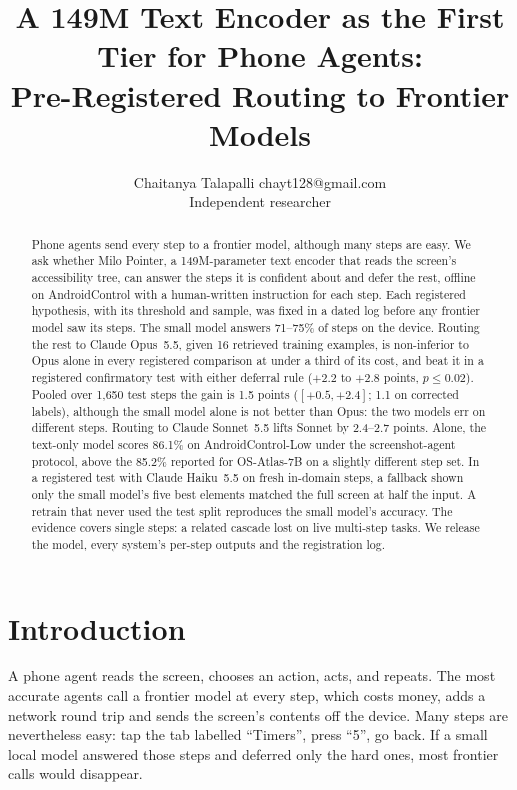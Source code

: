 \documentclass[10pt]{article}
\title{A 149M Text Encoder as the First Tier for Phone Agents:\\Pre-Registered Routing to Frontier Models}
\author{\name Chaitanya Talapalli \email chayt128@gmail.com\\
\addr Independent researcher}
\begin{document}
\maketitle

\begin{abstract}
Phone agents send every step to a frontier model, although many steps are easy. We ask whether Milo Pointer, a 149M-parameter text encoder that reads the screen's accessibility tree, can answer the steps it is confident about and defer the rest, offline on AndroidControl with a human-written instruction for each step. Each registered hypothesis, with its threshold and sample, was fixed in a dated log before any frontier model saw its steps. The small model answers 71--75\% of steps on the device. Routing the rest to Claude Opus~5.5, given 16 retrieved training examples, is non-inferior to Opus alone in every registered comparison at under a third of its cost, and beat it in a registered confirmatory test with either deferral rule ($+2.2$ to $+2.8$ points, $p\le0.02$). Pooled over 1{,}650 test steps the gain is 1.5 points ($[+0.5, +2.4]$; 1.1 on corrected labels), although the small model alone is not better than Opus: the two models err on different steps. Routing to Claude Sonnet~5.5 lifts Sonnet by 2.4--2.7 points. Alone, the text-only model scores 86.1\% on AndroidControl-Low under the screenshot-agent protocol, above the 85.2\% reported for OS-Atlas-7B on a slightly different step set. In a registered test with Claude Haiku~5.5 on fresh in-domain steps, a fallback shown only the small model's five best elements matched the full screen at half the input. A retrain that never used the test split reproduces the small model's accuracy. The evidence covers single steps: a related cascade lost on live multi-step tasks. We release the model, every system's per-step outputs and the registration log.
\end{abstract}

\section{Introduction}
A phone agent reads the screen, chooses an action, acts, and repeats. The most accurate agents call a frontier model at every step, which costs money, adds a network round trip and sends the screen's contents off the device. Many steps are nevertheless easy: tap the tab labelled ``Timers'', press ``5'', go back. If a small local model answered those steps and deferred only the hard ones, most frontier calls would disappear.
\end{document}
